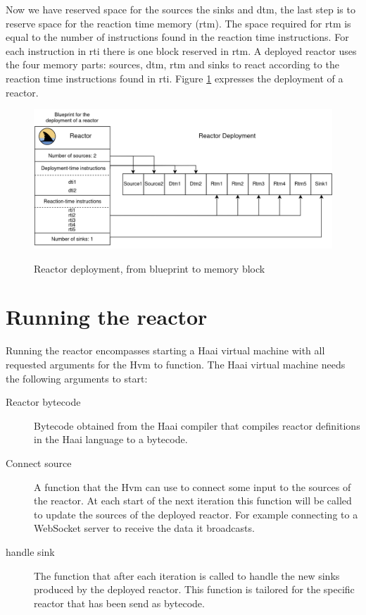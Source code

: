 \documentclass[a4paper]{book}
\begin{document}
Now we have reserved space for the sources the sinks and dtm, the last step is to reserve space for the reaction time memory (rtm). The space required for rtm is equal to the number of instructions found in the reaction time instructions. For each instruction in rti there is one block reserved in rtm. A deployed reactor uses the four memory parts: sources, dtm, rtm and sinks to react according to the reaction time instructions found in rti. Figure \ref{fig:rde} expresses the deployment of a reactor.

\begin{figure}[h]
	\caption{Reactor deployment, from blueprint to memory block}
	\includegraphics[width=\textwidth]{rd.drawio}
	\label{fig:rde}
\end{figure} 

\section{Running the reactor}
Running the reactor encompasses starting a Haai virtual machine with all requested arguments for the Hvm to function. The Haai virtual machine needs the following arguments to start: 
\begin{description}
	\item[Reactor bytecode] Bytecode obtained from the Haai compiler that compiles reactor definitions in the Haai language to a bytecode.
	\item[Connect source] A function that the Hvm can use to connect some input to the sources of the reactor. At each start of the next iteration this function will be called to update the sources of the deployed reactor. For example connecting to a WebSocket server to receive the data it broadcasts.
	\item[handle sink] The function that after each iteration is called to handle the new sinks produced by the deployed reactor. This function is tailored for the specific reactor that has been send as bytecode.
\end{description}
\end{document}
